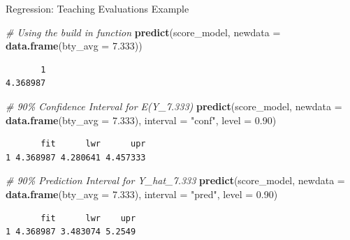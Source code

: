 \documentclass[
  ignorenonframetext,
]{beamer}
\newenvironment{Shaded}{\begin{snugshade}}{\end{snugshade}}
\newcommand{\AttributeTok}[1]{\textcolor[rgb]{0.13,0.29,0.53}{#1}}
\newcommand{\CommentTok}[1]{\textcolor[rgb]{0.56,0.35,0.01}{\textit{#1}}}
\newcommand{\FloatTok}[1]{\textcolor[rgb]{0.00,0.00,0.81}{#1}}
\newcommand{\FunctionTok}[1]{\textcolor[rgb]{0.13,0.29,0.53}{\textbf{#1}}}
\newcommand{\NormalTok}[1]{#1}
\newcommand{\StringTok}[1]{\textcolor[rgb]{0.31,0.60,0.02}{#1}}
\begin{document}
\begin{frame}[fragile]{Regression: Teaching Evaluations Example}
\protect{}\label{regression-teaching-evaluations-example-17}
\normalsize

\begin{Shaded}
\begin{Highlighting}[]
\CommentTok{\# Using the build in function}
\FunctionTok{predict}\NormalTok{(score\_model, }\AttributeTok{newdata =} \FunctionTok{data.frame}\NormalTok{(}\AttributeTok{bty\_avg =} \FloatTok{7.333}\NormalTok{))}
\end{Highlighting}
\end{Shaded}

\begin{verbatim}
       1 
4.368987 
\end{verbatim}

\begin{Shaded}
\begin{Highlighting}[]
\CommentTok{\# 90\% Confidence Interval for E(Y\_7.333)}
\FunctionTok{predict}\NormalTok{(score\_model, }\AttributeTok{newdata =} \FunctionTok{data.frame}\NormalTok{(}\AttributeTok{bty\_avg =} \FloatTok{7.333}\NormalTok{), }
        \AttributeTok{interval =} \StringTok{"conf"}\NormalTok{, }\AttributeTok{level =} \FloatTok{0.90}\NormalTok{)}
\end{Highlighting}
\end{Shaded}

\begin{verbatim}
       fit      lwr      upr
1 4.368987 4.280641 4.457333
\end{verbatim}

\begin{Shaded}
\begin{Highlighting}[]
\CommentTok{\# 90\% Prediction Interval for Y\_hat\_7.333}
\FunctionTok{predict}\NormalTok{(score\_model, }\AttributeTok{newdata =} \FunctionTok{data.frame}\NormalTok{(}\AttributeTok{bty\_avg =} \FloatTok{7.333}\NormalTok{), }
        \AttributeTok{interval =} \StringTok{"pred"}\NormalTok{, }\AttributeTok{level =} \FloatTok{0.90}\NormalTok{)}
\end{Highlighting}
\end{Shaded}

\begin{verbatim}
       fit      lwr    upr
1 4.368987 3.483074 5.2549
\end{verbatim}

\normalsize
\end{frame}
\end{document}
